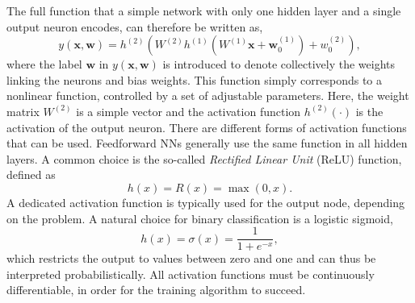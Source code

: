 The full function that a simple network with only one hidden layer and a single output neuron encodes, can therefore be written as,
\begin{equation}
    y(\pmb{x}, \pmb{w}) = h^{(2)} \left( W^{(2)} h^{(1)} \left(  W^{(1)} \pmb{x} + \pmb{w}^{(1)}_{0}    \right) + w^{(2)}_{0} \right),
\end{equation}
where the label $\pmb{w}$ in $y(\pmb{x}, \pmb{w})$ is introduced to denote collectively the weights linking the neurons and bias weights.
This function simply corresponds to a nonlinear function, controlled by a set of adjustable parameters. Here, the weight matrix $W^{(2)}$ is a simple vector and the activation function $h^{(2)}(\cdot)$ is the activation of the output neuron.
There are different forms of activation functions that can be used.
Feedforward NNs generally use the same function in all hidden layers.
A common choice is the so-called \emph{Rectified Linear Unit} (ReLU) function, defined as
\begin{equation}
    {h(x)= R(x) = \max(0,x)}.    
\end{equation}
A dedicated activation function is typically used for the output node, depending on the problem.
A natural choice for binary classification is a logistic sigmoid,
\begin{equation}
    \label{eq:logistic-sigmoid}
    h(x)= \sigma(x) = {\frac {1}{1+e^{-x}}},
\end{equation}
which restricts the output to values between zero and one and can thus be interpreted probabilistically.
All activation functions must be continuously differentiable, in order for the training algorithm to succeed.






